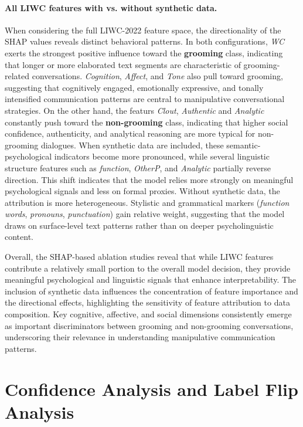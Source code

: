 \paragraph{All LIWC features with vs. without synthetic data.}
When considering the full LIWC-2022 feature space, the directionality of the SHAP values reveals distinct behavioral patterns. In both configurations, \textit{WC} exerts the strongest positive influence toward the \textbf{grooming} class, indicating that longer or more elaborated text segments are characteristic of grooming-related conversations. \textit{Cognition}, \textit{Affect}, and \textit{Tone} also pull toward grooming, suggesting that cognitively engaged, emotionally expressive, and tonally intensified communication patterns are central to manipulative conversational strategies. On the other hand, the featurs \textit{Clout}, \textit{Authentic} and \textit{Analytic} constantly push toward the \textbf{non-grooming} class, indicating that higher social confidence, authenticity, and analytical reasoning are more typical for non-grooming dialogues. When synthetic data are included, these semantic-psychological indicators become more pronounced, while several linguistic structure features such as \textit{function}, \textit{OtherP}, and \textit{Analytic} partially reverse direction. This shift indicates that the model relies more strongly on meaningful psychological signals and less on formal proxies. Without synthetic data, the attribution is more heterogeneous. Stylistic and grammatical markers (\textit{function words}, \textit{pronouns}, \textit{punctuation}) gain relative weight, suggesting that the model draws on surface-level text patterns rather than on deeper psycholinguistic content.

Overall, the SHAP-based ablation studies reveal that while LIWC features contribute a relatively small portion to the overall model decision, they provide meaningful psychological and linguistic signals that enhance interpretability. The inclusion of synthetic data influences the concentration of feature importance and the directional effects, highlighting the sensitivity of feature attribution to data composition. Key cognitive, affective, and social dimensions consistently emerge as important discriminators between grooming and non-grooming conversations, underscoring their relevance in understanding manipulative communication patterns.


\section{Confidence Analysis and Label Flip Analysis} \label{sec:confidence_and_label_flip_analysis}


